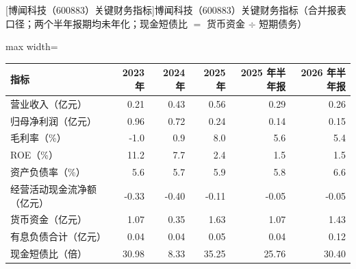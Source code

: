 \begin{center}\small\setlength{\tabcolsep}{3.4pt}
[博闻科技（600883）关键财务指标]{博闻科技（600883）关键财务指标（合并报表口径；两个半年报期均未年化；现金短债比 $=$ 货币资金 $\div$ 短期债务）}
\begin{adjustbox}{max width=\textwidth}
\begin{tabular}{@{}lrrrrr@{}}
\toprule
指标 & 2023 年 & 2024 年 & 2025 年 & 2025 年半年报 & 2026 年半年报 \\
\midrule
营业收入（亿元） & 0.21 & 0.43 & 0.56 & 0.29 & 0.26 \\
归母净利润（亿元） & 0.96 & 0.72 & 0.24 & 0.14 & 0.15 \\
毛利率（\%） & -1.0 & 0.9 & 8.0 & 5.6 & 5.4 \\
ROE（\%） & 11.2 & 7.7 & 2.4 & 1.5 & 1.5 \\
资产负债率（\%） & 5.6 & 5.7 & 5.9 & 5.8 & 6.6 \\
经营活动现金流净额（亿元） & -0.33 & -0.40 & -0.11 & -0.05 & -0.05 \\
货币资金（亿元） & 1.07 & 0.35 & 1.63 & 1.07 & 1.43 \\
有息负债合计（亿元） & 0.04 & 0.04 & 0.05 & 0.04 & 0.12 \\
现金短债比（倍） & 30.98 & 8.33 & 35.25 & 25.76 & 30.40 \\
\bottomrule
\end{tabular}
\end{adjustbox}
\end{center}

